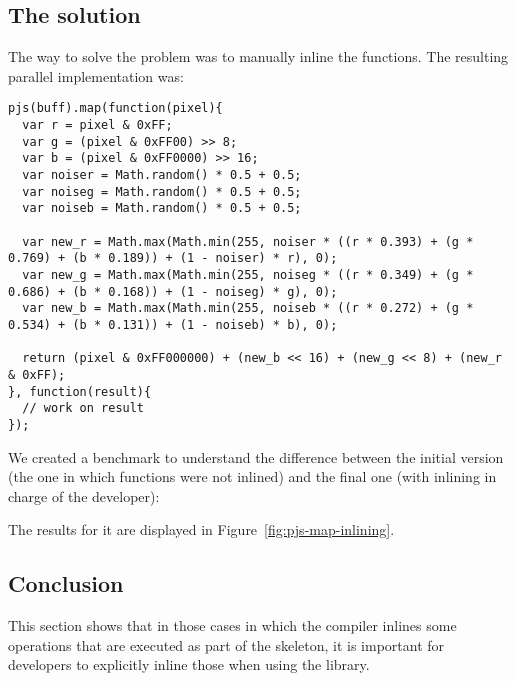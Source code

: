 \subsection{The solution}
The way to solve the problem was to manually inline the functions. The resulting parallel implementation was:
\begin{lstlisting}[caption=Sepia tone final parallel implementation]
pjs(buff).map(function(pixel){
  var r = pixel & 0xFF;
  var g = (pixel & 0xFF00) >> 8;
  var b = (pixel & 0xFF0000) >> 16;
  var noiser = Math.random() * 0.5 + 0.5;
  var noiseg = Math.random() * 0.5 + 0.5;
  var noiseb = Math.random() * 0.5 + 0.5;

  var new_r = Math.max(Math.min(255, noiser * ((r * 0.393) + (g * 0.769) + (b * 0.189)) + (1 - noiser) * r), 0);
  var new_g = Math.max(Math.min(255, noiseg * ((r * 0.349) + (g * 0.686) + (b * 0.168)) + (1 - noiseg) * g), 0);
  var new_b = Math.max(Math.min(255, noiseb * ((r * 0.272) + (g * 0.534) + (b * 0.131)) + (1 - noiseb) * b), 0);

  return (pixel & 0xFF000000) + (new_b << 16) + (new_g << 8) + (new_r & 0xFF);
}, function(result){
  // work on result
});
\end{lstlisting}

We created a benchmark to understand the difference between the initial version (the one in which functions were not inlined) and the final one (with inlining in charge of the developer):

The results for it are displayed in Figure~\ref{fig:pjs-map-inlining}.

\subsection{Conclusion}
This section shows that in those cases in which the compiler inlines some operations that are executed as part of the skeleton, it is important for developers to explicitly inline those when using the library.

\pagebreak
